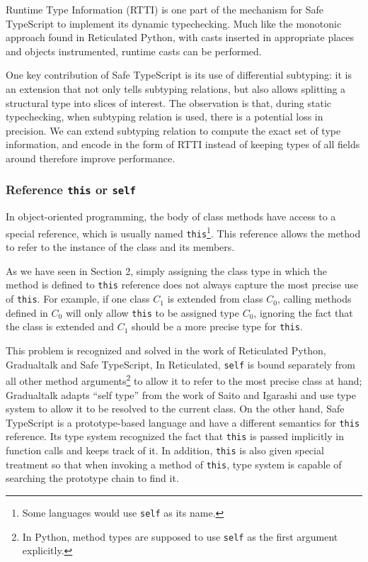 Runtime Type Information (RTTI) is one part of the mechanism for Safe TypeScript
to implement its dynamic typechecking. Much like the monotonic approach found in Reticulated Python,
with casts inserted in appropriate places and objects instrumented, runtime casts can be performed.

One key contribution of Safe TypeScript is its use of differential subtyping:
it is an extension that not only tells subtyping relations, but also allows splitting
a structural type into slices of interest.
The observation is that, during static typechecking, when subtyping relation is used, there is a potential loss in precision. We can extend subtyping relation to compute the exact set of type information,
and encode in the form of RTTI instead of keeping types of all fields around therefore improve performance.

\subsubsection{Reference \texttt{this} or \texttt{self}}

In object-oriented programming, the body of class methods
have access to a special reference,
which is usually named \texttt{this}\footnote{Some languages would use \texttt{self} as its name.}.
This reference allows the method to refer to the instance of the class and its members.

As we have seen in Section 2, simply assigning the class type in which the method is defined
to \texttt{this} reference
does not always capture the most precise use of \texttt{this}.
For example,
if one class $C_1$ is extended from class $C_0$, calling methods
defined in $C_0$ will only allow \texttt{this} to be assigned type $C_0$, ignoring
the fact that the class is extended and $C_1$ should be a more precise type for \texttt{this}.

This problem is recognized and solved in the work of
Reticulated Python, Gradualtalk and Safe TypeScript, 
In Reticulated, \texttt{self} is bound separately from all other method arguments\footnote{In Python,
method types are supposed to use \texttt{self} as the first argument explicitly.}
to allow it to refer to the most precise class at hand;
Gradualtalk adapts ``self type'' from the work of Saito and Igarashi\cite{saito2009self}
and use type system to allow it to be resolved to the current class.
On the other hand, Safe TypeScript is a prototype-based language and have a different
semantics for \texttt{this} reference.
Its type system recognized the fact that \texttt{this} is passed implicitly
in function calls and keeps track of it.
In addition, \texttt{this} is also given special treatment
so that when invoking a method of \texttt{this}, type system is capable of
searching the prototype chain to find it.

